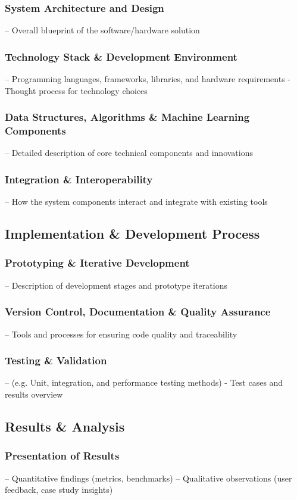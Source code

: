 \subsubsection{System Architecture and Design}
– Overall blueprint of the software/hardware solution
\subsubsection{Technology Stack \& Development Environment}
– Programming languages, frameworks, libraries, and hardware requirements
- Thought process for technology choices
\subsubsection{Data Structures, Algorithms \& Machine Learning Components}
– Detailed description of core technical components and innovations
\subsubsection{Integration \& Interoperability}
– How the system components interact and integrate with existing tools
\subsection{Implementation \& Development Process}
\subsubsection{Prototyping \& Iterative Development}
– Description of development stages and prototype iterations
\subsubsection{Version Control, Documentation \& Quality Assurance}
– Tools and processes for ensuring code quality and traceability
\subsubsection{Testing \& Validation}
– (e.g. Unit, integration, and performance testing methods)
- Test cases and results overview
\subsection{Results \& Analysis}
\subsubsection{Presentation of Results}
– Quantitative findings (metrics, benchmarks)
– Qualitative observations (user feedback, case study insights)

